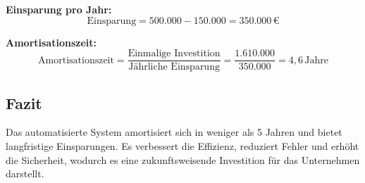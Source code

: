 \textbf{Einsparung pro Jahr:}  
\[
\text{Einsparung} = 500.000 - 150.000 = 350.000 \, \text{€}
\]

\textbf{Amortisationszeit:}  
\[
\text{Amortisationszeit} = \frac{\text{Einmalige Investition}}{\text{Jährliche Einsparung}} = \frac{1.610.000}{350.000} = 4{,}6 \, \text{Jahre}
\]

\subsection*{Fazit}
Das automatisierte System amortisiert sich in weniger als 5 Jahren und bietet langfristige Einsparungen. Es verbessert die Effizienz, reduziert Fehler und erhöht die Sicherheit, wodurch es eine zukunftsweisende Investition für das Unternehmen darstellt.


